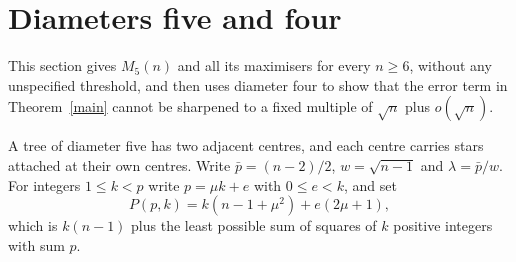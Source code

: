 \documentclass[11pt,a4paper]{article}
\theoremstyle{remark}
\begin{document}
\section{Diameters five and four}\label{sec:five}
This section gives $M_5(n)$ and all its maximisers for every $n\ge6$, without any unspecified threshold, and then uses diameter four to show that the error term in Theorem~\ref{main} cannot be sharpened to a fixed multiple of $\sqrt n$ plus $o(\sqrt n)$.

A tree of diameter five has two adjacent centres, and each centre carries stars attached at their own centres. Write $\bar p=(n-2)/2$, $w=\sqrt{n-1}$ and $\lambda=\bar p/w$. For integers $1\le k<p$ write $p=\mu k+e$ with $0\le e<k$, and set
\[
 P(p,k)=k(n-1+\mu^2)+e(2\mu+1),
\]
which is $k(n-1)$ plus the least possible sum of squares of $k$ positive integers with sum $p$.
\end{document}
